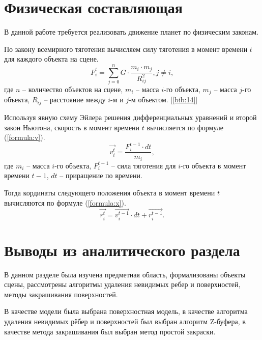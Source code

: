     \section{Физическая составляющая}
    \par В данной работе требуется реализовать движение планет по физическим законам. 
    \par По закону всемирного тяготения вычисляем силу тяготения в момент времени $t$ для каждого объекта на сцене.
    \begin{equation}\label{formula:F}
		F_i^t = \sum_{j=0}^{n} G \cdot \frac{m_i \cdot m_j}{R_{ij}^2}, j \neq i, 
	\end{equation}
	где $n$ -- количество объектов на сцене, \begin{math}m_i\end{math} -- масса $i$-го объекта, \begin{math}m_j\end{math} -- масса $j$-го объекта, \begin{math}R_{ij}\end{math} -- расстояние между $i$-м и $j$-м объектом. [\ref{bib:14}]
	\par Используя явную схему Эйлера решения дифференциальных уравнений и второй закон Ньютона, скорость в момент времени $t$ вычисляется по формуле (\ref{formula:v}).
	\begin{equation}\label{formula:v}
		\vec{v_i^t} = \frac {F_{i}^{t-1} \cdot dt} {m_i},
	\end{equation}
	где \begin{math}m_i\end{math} -- масса $i$-го объекта, \begin{math}F_{i}^{t-1}\end{math} -- сила тяготения для $i$-го объекта в момент времени $t-1$, \begin{math}dt\end{math} -- приращение по времени.
	\par Тогда кординаты следующего положения объекта в момент времени $t$ вычисляются по формуле (\ref{formula:x}).
	\begin{equation}\label{formula:x}
    	\vec{r_i^t} = \vec{v_{i}^{t-1}} \cdot dt + \vec{r_{i}^{t-1}}.
	\end{equation}
    \section{Выводы из аналитического раздела}
    \par В данном разделе была изучена предметная область, формализованы объекты сцены, рассмотрены алгоритмы удаления невидимых ребер и поверхностей, методы закрашивания поверхностей. 
    \par В качестве модели была выбрана поверхностная модель, в качестве алгоритма удаления невидимых рёбер и поверхностей был выбран алгоритм Z-буфера, в качестве метода закрашивания был выбран метод простой закраски.

